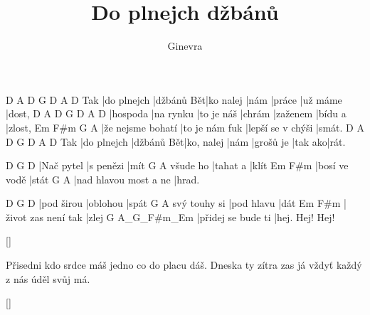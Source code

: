\documentclass{song}
\author{Ginevra}
\title{Do plnejch džbánů}
\begin{document}
    D           A          D         G    D      A        D
Tak |do plnejch |džbánů Bět|ko nalej |nám |práce |už máme |dost,
D        A         D          G      D        A       D
|hospoda |na rynku |to je náš |chrám |zaženem |bídu a |zlost,
Em                F#m            G                 A
|že nejsme bohatí |to je nám fuk |lepší se v chýši |smát.
    D           A          D          G    D         A       D
Tak |do plnejch |džbánů Bět|ko, nalej |nám |grošů je |tak ako|rát.
\endstrophe

\strophe
D          G         D
|Nač pytel |s penězi |mít
         G        A
všude ho |tahat a |klít
Em            F#m
|bosí ve vodě |stát
G                     A
|nad hlavou most a ne |hrad.
\endstrophe

\strophe
D          G        D
|pod širou |oblohou |spát
             G          A
svý touhy si |pod hlavu |dát
Em                  F#m
|život zas není tak |zlej
G                  A_G_F#m_Em
|přidej se bude ti |hej. Hej! Hej!
\endstrophe

\ref{}

\strophe*
Přisedni kdo srdce máš
jedno co do placu dáš.
Dneska ty zítra zas já
vždyť každý z nás úděl svůj má.
\endstrophe

\ref{}
\end{document}
